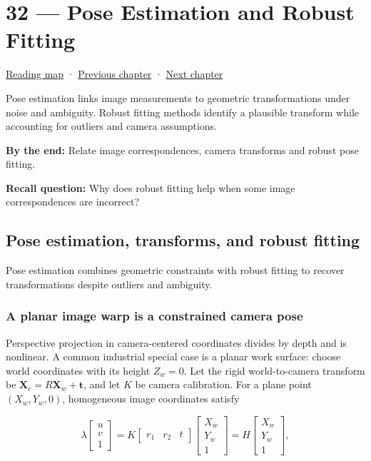 \hypertarget{04-visual-computing-ii-ch032}{}
\section{32 --- Pose Estimation and Robust Fitting}\label{pose-estimation-and-robust-fitting}

\href{Chapter\%20Edition/02\%20-\%20Graphics\%20Vision\%20and\%20XR/00\%20-\%20Reading\%20Map}{Reading map} · \hyperref[04-visual-computing-ii-ch031]{Previous chapter} · \hyperref[04-visual-computing-ii-ch033]{Next chapter}

Pose estimation links image measurements to geometric transformations under noise and ambiguity. Robust fitting methods identify a plausible transform while accounting for outliers and camera assumptions.

\textbf{By the end:} Relate image correspondences, camera transforms and robust pose fitting.

\textbf{Recall question:} Why does robust fitting help when some image correspondences are incorrect?

\subsection{Pose estimation, transforms, and robust fitting}\label{pose-estimation-transforms-and-robust-fitting}

Pose estimation combines geometric constraints with robust fitting to recover transformations despite outliers and ambiguity.

\subsubsection{A planar image warp is a constrained camera pose}\label{a-planar-image-warp-is-a-constrained-camera-pose}

Perspective projection in camera-centered coordinates divides by depth and is nonlinear. A common industrial special case is a planar work surface: choose world coordinates with its height \(Z_w=0\). Let the rigid world-to-camera transform be \(\mathbf{X}_c=R\mathbf{X}_w+\mathbf{t}\), and let \(K\) be camera calibration. For a plane point \((X_w,Y_w,0)\), homogeneous image coordinates satisfy

\[
\lambda\begin{bmatrix}u\\v\\1\end{bmatrix}=K\begin{bmatrix}r_1&r_2&t\end{bmatrix}\begin{bmatrix}X_w\\Y_w\\1\end{bmatrix}=H\begin{bmatrix}X_w\\Y_w\\1\end{bmatrix},
\]

